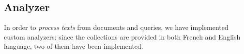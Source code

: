 \subsection{Analyzer}
\label{subsec:analyzer}

In order to \emph{process texts} from documents and queries, we have implemented custom analyzers: since the collections are provided in both French and English language, two of them have been implemented.




